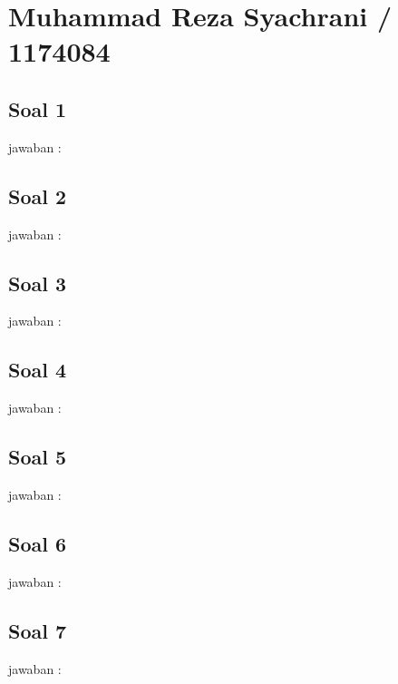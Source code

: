 
\section{Muhammad Reza Syachrani / 1174084}
\subsection{Soal 1}
jawaban : 

\subsection{Soal 2}
jawaban : 

\subsection{Soal 3}
jawaban : 

\subsection{Soal 4}
jawaban : 

\subsection{Soal 5}
jawaban : 

\subsection{Soal 6}
jawaban : 

\subsection{Soal 7}
jawaban : 

